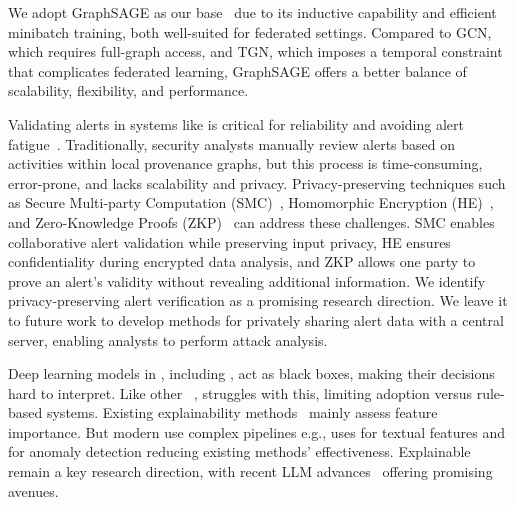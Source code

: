  We adopt GraphSAGE as our base \gnnshort\ due to its inductive capability and efficient minibatch training, both well-suited for federated settings. Compared to GCN, which requires full-graph access, and TGN, which imposes a temporal constraint that complicates federated learning, GraphSAGE offers a better balance of scalability, flexibility, and performance.


 Validating alerts in systems like \Sys is critical for reliability and avoiding alert fatigue~\cite{nodoze2019}. Traditionally, security analysts manually review alerts based on activities within local provenance graphs, but this process is time-consuming, error-prone, and lacks scalability and privacy. Privacy-preserving techniques such as Secure Multi-party Computation (SMC)~\cite{goldreich1998secure}, Homomorphic Encryption (HE)~\cite{yi2014homomorphic}, and Zero-Knowledge Proofs (ZKP)~\cite{fiege1987zero} can address these challenges. SMC enables collaborative alert validation while preserving input privacy, HE ensures confidentiality during encrypted data analysis, and ZKP allows one party to prove an alert's validity without revealing additional information. We identify privacy-preserving alert verification as a promising research direction. We leave it to future work to develop methods for privately sharing alert data with a central server, enabling analysts to perform attack analysis.

 Deep learning models in \pids, including \Sys, act as black boxes, making their decisions hard to interpret. Like other \pids~\cite{flash2024,cheng2023kairos,yangprographer}, \Sys struggles with this, limiting adoption versus rule-based systems. Existing explainability methods~\cite{antwarg2021explaining,brown2018recurrent,ardito2021revisiting,hwang2021sfd} mainly assess feature importance. But modern \pids use complex pipelines e.g., \flash uses \wordvec for textual features and \gnnshort for anomaly detection reducing existing methods' effectiveness. Explainable \pids remain a key research direction, with recent LLM advances~\cite{chang2024survey} offering promising avenues.




